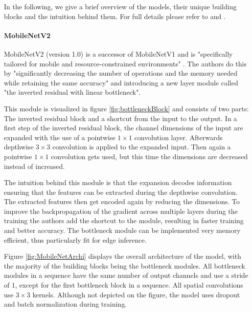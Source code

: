 In the following, we give a brief overview of the models, their unique building blocks and the intuition behind them.
For full details please refer to \cite{DBLP:journals/corr/abs-1801-04381} and \cite{InceptionV4}.

\paragraph{MobileNetV2}
MobileNetV2 (version 1.0) is a successor of MobileNetV1 and is "specifically tailored for mobile and resource-constrained environments" \cite{DBLP:journals/corr/abs-1801-04381}. The authors do this by "significantly decreasing the number of operations and the memory needed while retaining the same accuracy"  \cite{DBLP:journals/corr/abs-1801-04381} and introducing a new layer module called "the
inverted residual with linear bottleneck".

This module is visualized in figure \ref{fig:bottleneckBlock} and consists of two parts: The inverted residual block and a shortcut from the input to the output.
In a first step of the inverted residual block, the channel dimensions of the input are expanded with the use of a pointwise $1\times1$ convolution layer. 
Afterwards depthwise $3\times3$ convolution is applied to the expanded input. Then again a pointwise $1\times1$ convolution gets used, but this time the dimensions are decreased instead of increased.

The intuition behind this module is that the expansion decodes information ensuring that the features can be extracted during the depthwise convolution. The extracted features then get encoded again by reducing the dimensions.
To improve the backpropagation of the gradient across multiple layers during the training the authors add the shortcut to the module, resulting in faster training and better accuracy.
The bottleneck module can be implemented very memory efficient, thus particularly fit for edge inference.

Figure \ref{fig:MobileNetArchi} displays the overall architecture of the model, with the majority of the building blocks being the bottleneck modules.
All bottleneck modules in a sequence have the same number of output channels and use a stride of $1$, except for the first bottleneck block in a sequence. All spatial convolutions use $3\times3$ kernels. 
Although not depicted on the figure, the model uses dropout and batch normalization during training.

